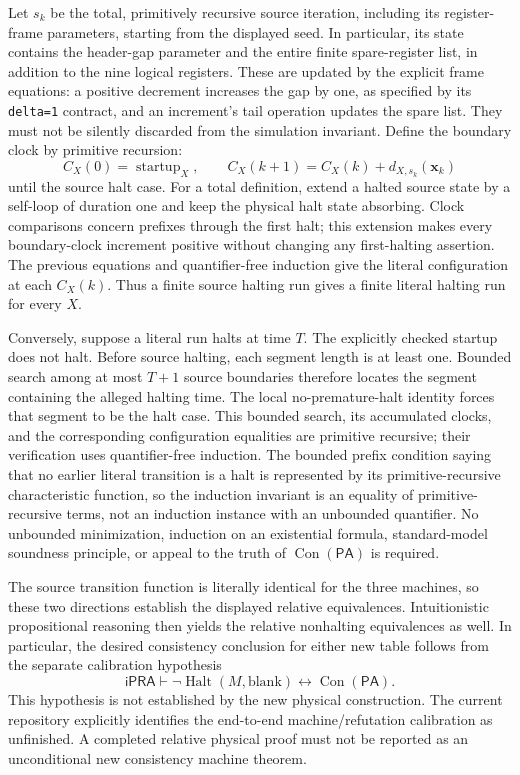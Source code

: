Let $s_k$ be the total, primitively recursive source iteration, including
its register-frame parameters, starting from the displayed seed.  In
particular, its state contains the header-gap parameter and the entire
finite spare-register list, in addition to the nine logical registers.
These are updated by the explicit frame equations: a positive decrement
increases the gap by one, as specified by its \texttt{delta=1} contract, and an
increment's tail operation updates the spare list.  They must not be
silently discarded from the simulation invariant.  Define
the boundary clock by primitive recursion:
\[
 C_X(0)=\operatorname{startup}_X,\qquad
 C_X(k+1)=C_X(k)+d_{X,s_k}(\mathbf x_k)
\]
until the source halt case. For a total definition, extend a halted source
state by a self-loop of duration one and keep the physical halt state
absorbing. Clock comparisons concern prefixes through the first halt; this
extension makes every boundary-clock increment positive without changing
any first-halting assertion.  The previous equations and quantifier-free induction give the
literal configuration at each $C_X(k)$.  Thus a finite source halting
run gives a finite literal halting run for every $X$.

Conversely, suppose a literal run halts at time $T$.  The explicitly checked
startup does not halt.  Before source halting, each segment length is at
least one.  Bounded search among at most $T+1$ source boundaries therefore
locates the segment containing the alleged halting time.  The local
no-premature-halt identity forces that segment to be the halt case.  This
bounded search, its accumulated clocks, and the corresponding configuration
equalities are primitive recursive; their verification uses
quantifier-free induction.  The bounded prefix condition saying that no
earlier literal transition is a halt is represented by its
primitive-recursive characteristic function, so the induction invariant
is an equality of primitive-recursive terms, not an induction instance
with an unbounded quantifier.  No unbounded minimization, induction on an
existential formula, standard-model soundness principle, or appeal to the
truth of $\operatorname{Con}(\mathsf{PA})$ is required.

The source transition function is literally identical for the three
machines, so these two directions establish the displayed relative
equivalences.  Intuitionistic propositional reasoning then yields the
relative nonhalting equivalences as well.  In particular, the desired
consistency conclusion for either new table follows from the separate
calibration hypothesis
\[
 \mathsf{iPRA}\vdash
 \neg\operatorname{Halt}(M,\mathrm{blank})
 \leftrightarrow\operatorname{Con}(\mathsf{PA}).
\]
This hypothesis is not established by the new physical construction.
The current repository explicitly identifies the end-to-end
machine/refutation calibration as unfinished.  A completed relative
physical proof must not be reported as an unconditional new consistency
machine theorem.

